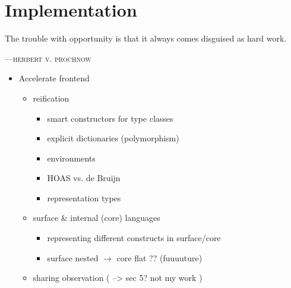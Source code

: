 %
%
%

\chapter{Implementation}
\epigraph{The trouble with opportunity is that it always comes disguised as hard work.}%
{\textsc{---herbert v. prochnow}}

\begin{itemize}
    \item Accelerate frontend
        \begin{itemize}
            \item reification
                \begin{itemize}
                    \item smart constructors for type classes
                    \item explicit dictionaries (polymorphism)
                    \item environments
                    \item HOAS vs. de Bruijn
                    \item representation types
                \end{itemize}
            \item surface \& internal (core) languages
                \begin{itemize}
                    \item representing different constructs in surface/core
                    \item surface nested $\rightarrow$ core flat ?? (fuuuuture)
                \end{itemize}
            \item sharing observation ( --> sec 5? not my work )
        \end{itemize}


\end{itemize}
